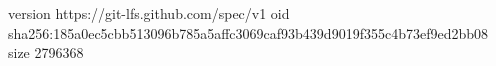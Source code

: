 version https://git-lfs.github.com/spec/v1
oid sha256:185a0ec5cbb513096b785a5affc3069caf93b439d9019f355c4b73ef9ed2bb08
size 2796368
